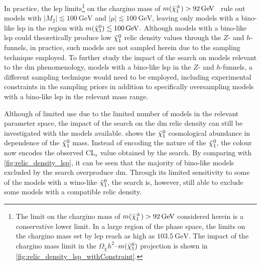 In practice, the \gls{lep} limits\footnote{The limit on the chargino mass of $m(\charg) > \SI{92}{\GeV}$ considered herein is a conservative lower limit. In a large region of the phase space, the limits on the chargino mass set by \gls{lep} reach as high as $\SI{103.5}{\GeV}$. The impact of the chargino mass limit in the $\Omega_{\tilde{\chi}} h^2$--$m(\tilde{\chi}_1^0)$ projection is shown in \cref{fig:relic_density_lsp_withConstraint}.} on the chargino mass of $m(\charg) > \SI{92}{\GeV}$~\cite{lep_susy_results} rule out models with $\vert M_2 \vert \lesssim \SI{100}{\GeV}$ and $\vert \mu \vert \lesssim \SI{100}{\GeV}$, leaving only models with a bino-like \gls{lsp} in the region with $m(\lsp)\lesssim \SI{100}{\GeV}$.
Although models with a bino-like \gls{lsp} could theoretically produce low $\tilde{\chi}_1^0$ relic density values through the $Z$- and $h$-funnels, in practice, such models are not sampled herein due to the sampling technique employed.
To further study the impact of the \onelepton search on models relevant to the \gls{dm} phenomenology, \ie models with a bino-like \gls{lsp} in the $Z$- and $h$-funnels, a different sampling technique would need to be employed, including experimental constraints in the sampling priors in addition to specifically oversampling models with a bino-like \gls{lsp} in the relevant mass range.

Although of limited use due to the limited number of models in the relevant parameter space, the impact of the \onelepton search on the \gls{dm} relic density can still be investigated with the models available.  shows the $\tilde{\chi}_1^0$ cosmological abundance in dependence of the $\tilde{\chi}_1^0$ mass. Instead of encoding the nature of the $\tilde{\chi}_1^0$, the colour now encodes the observed CL$_s$ value obtained by the \onelepton search. By comparing with \cref{fig:relic_density_lsp}, it can be seen that the majority of bino-like models excluded by the \onelepton search overproduce \gls{dm}. Through its limited sensitivity to some of the models with a wino-like $\tilde{\chi}_1^0$, the \onelepton search is, however, still able to exclude some models with a compatible relic density. 

